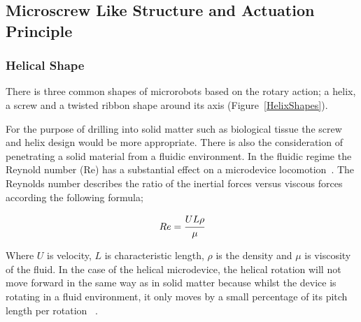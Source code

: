 \documentclass[a4paper,11pt]{article}
\begin{document}
\begin{sloppypar}
\subsection{Microscrew Like Structure and Actuation Principle}
\paragraph{}
\subsubsection{Helical Shape}

 There is three common shapes of microrobots 
based on the rotary action; a helix, a screw and a twisted ribbon shape around its axis (Figure~\ref{HelixShapes}). 


For the purpose of drilling into solid matter such as biological tissue the screw and helix 
design would be more appropriate. There is also the consideration of penetrating a solid 
material from a fluidic environment. In the fluidic regime the Reynold number (Re) has a substantial effect on a microdevice
locomotion~\citep{peyer2013magnetic}. The Reynolds number describes the ratio of the inertial forces versus viscous 
forces according the following formula;

\begin{equation}
  Re = \cfrac{UL\rho}{\mu}
\label{eq:4}
\end{equation}
 
Where $ U$ is velocity, $L$ is characteristic length, $\rho$ is the density and $\mu$ is viscosity of the fluid.
 In the case of the helical microdevice, the helical rotation will not move 
forward in the same way as in solid matter because whilst the device is rotating in a fluid environment, 
it only moves by a small percentage of its pitch length per rotation ~\citep{peyer2013magnetic}. 


\end{sloppypar}
\end{document}
